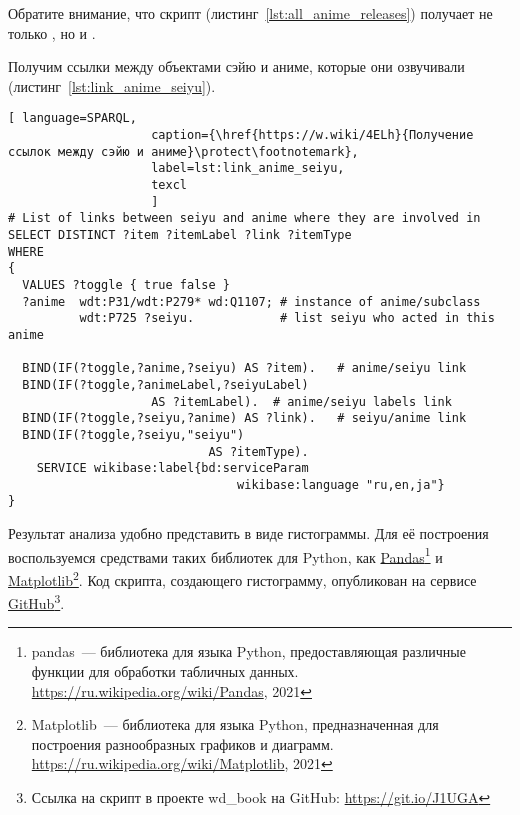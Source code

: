 Обратите внимание, что скрипт (листинг~\protect\ref{lst:all_anime_releases}) получает не только  , но и . 

Получим ссылки между объектами сэйю и аниме, которые они озвучивали (листинг~\protect\ref{lst:link_anime_seiyu}).

\begin{lstlisting}[ language=SPARQL, 
                    caption={\href{https://w.wiki/4ELh}{Получение ссылок между сэйю и аниме}\protect\footnotemark},
                    label=lst:link_anime_seiyu,
                    texcl 
                    ]
# List of links between seiyu and anime where they are involved in
SELECT DISTINCT ?item ?itemLabel ?link ?itemType
WHERE
{
  VALUES ?toggle { true false }
  ?anime  wdt:P31/wdt:P279* wd:Q1107; # instance of anime/subclass
          wdt:P725 ?seiyu.            # list seiyu who acted in this anime
  
  BIND(IF(?toggle,?anime,?seiyu) AS ?item).   # anime/seiyu link
  BIND(IF(?toggle,?animeLabel,?seiyuLabel)
					AS ?itemLabel).  # anime/seiyu labels link
  BIND(IF(?toggle,?seiyu,?anime) AS ?link).   # seiyu/anime link
  BIND(IF(?toggle,?seiyu,"seiyu")
							AS ?itemType).
    SERVICE wikibase:label{bd:serviceParam
					     		wikibase:language "ru,en,ja"}
}
\end{lstlisting}%

Результат анализа удобно представить в виде гистограммы. Для её построения воспользуемся средствами таких библиотек для Python, как \href{https://ru.wikipedia.org/wiki/Pandas}{Pandas}\footnote{pandas~--- библиотека для языка Python, предоставляющая различные функции для обработки табличных данных. \href{https://ru.wikipedia.org/wiki/Pandas}{https://ru.wikipedia.org/wiki/Pandas}, 2021} и \href{https://ru.wikipedia.org/wiki/Matplotlib}{Matplotlib}\footnote{Matplotlib~--- библиотека для языка Python, предназначенная для построения разнообразных графиков и диаграмм. \href{https://ru.wikipedia.org/wiki/Matplotlib}{https://ru.wikipedia.org/wiki/Matplotlib}, 2021}. Код скрипта, создающего гистограмму, опубликован на сервисе \href{https://git.io/J1UGA}{GitHub}\footnote{Ссылка на скрипт в проекте wd\_book на GitHub: \href{https://git.io/J1UGA}{https://git.io/J1UGA}}.

